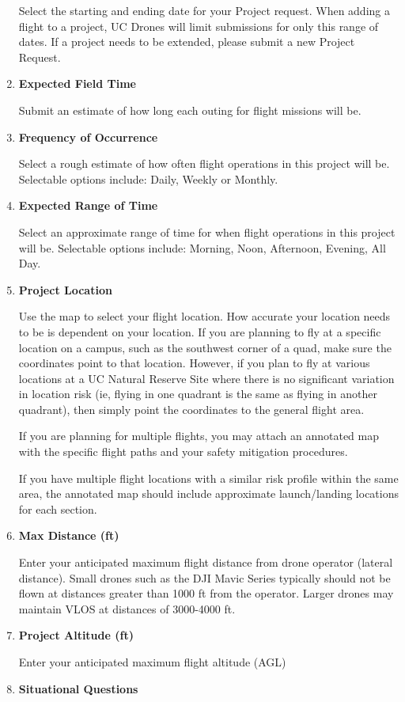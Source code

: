 \documentclass[
  12pt,
]{book}
\begin{document}
\begin{enumerate}
  Select the starting and ending date for your Project request. When adding a flight to a project, UC Drones will limit submissions for only this range of dates. If a project needs to be extended, please submit a new Project Request.
\item
  \textbf{Expected Field Time}

  Submit an estimate of how long each outing for flight missions will be.
\item
  \textbf{Frequency of Occurrence}

  Select a rough estimate of how often flight operations in this project will be. Selectable options include: Daily, Weekly or Monthly.
\item
  \textbf{Expected Range of Time}

  Select an approximate range of time for when flight operations in this project will be. Selectable options include: Morning, Noon, Afternoon, Evening, All Day.
\item
  \textbf{Project Location}

  Use the map to select your flight location. How accurate your location needs to be is dependent on your location. If you are planning to fly at a specific location on a campus, such as the southwest corner of a quad, make sure the coordinates point to that location. However, if you plan to fly at various locations at a UC Natural Reserve Site where there is no significant variation in location risk (ie, flying in one quadrant is the same as flying in another quadrant), then simply point the coordinates to the general flight area.

  If you are planning for multiple flights, you may attach an annotated map with the specific flight paths and your safety mitigation procedures.

  If you have multiple flight locations with a similar risk profile within the same area, the annotated map should include approximate launch/landing locations for each section.
\item
  \textbf{Max Distance (ft)}

  Enter your anticipated maximum flight distance from drone operator (lateral distance). Small drones such as the DJI Mavic Series typically should not be flown at distances greater than 1000 ft from the operator. Larger drones may maintain VLOS at distances of 3000-4000 ft.
\item
  \textbf{Project Altitude (ft)}

  Enter your anticipated maximum flight altitude (AGL)
\item
  \textbf{Situational Questions}


\end{enumerate}
\end{document}
